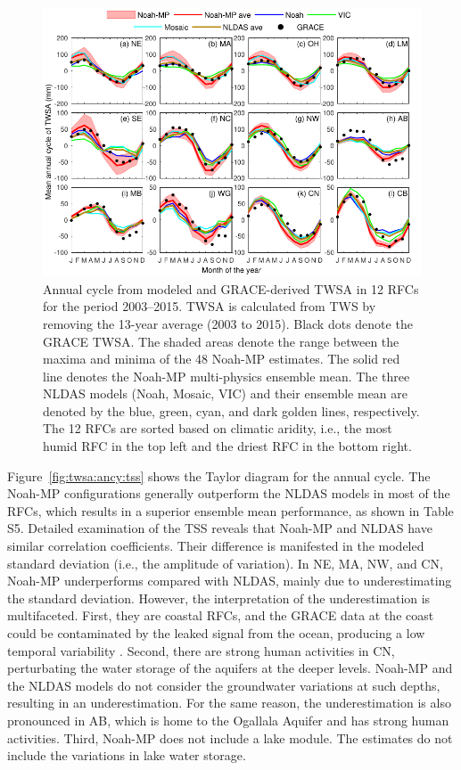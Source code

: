 \documentclass[essd, manuscript]{copernicus}
\begin{document}
\begin{figure}[t]
  \includegraphics[width=12cm]{fig/fig01.pdf}
  \caption{Annual cycle from modeled and GRACE-derived TWSA in 12 RFCs for the period 2003--2015. TWSA is calculated from TWS by removing the 13-year average (2003 to 2015). Black dots denote the GRACE TWSA\@. The shaded areas denote the range between the maxima and minima of the 48 Noah-MP estimates. The solid red line denotes the Noah-MP multi-physics ensemble mean. The three NLDAS models (Noah, Mosaic, VIC) and their ensemble mean are denoted by the blue, green, cyan, and dark golden lines, respectively. The 12 RFCs are sorted based on climatic aridity, i.e., the most humid RFC in the top left and the driest RFC in the bottom right.}
  \label{fig:twsa:ancy}
\end{figure}

Figure~\ref{fig:twsa:ancy:tss} shows the Taylor diagram for the annual cycle. The Noah-MP configurations generally outperform the NLDAS models in most of the RFCs, which results in a superior ensemble mean performance, as shown in Table S5. Detailed examination of the TSS reveals that Noah-MP and NLDAS have similar correlation coefficients. Their difference is manifested in the modeled standard deviation (i.e., the amplitude of variation). In NE, MA, NW, and CN, Noah-MP underperforms compared with NLDAS, mainly due to underestimating the standard deviation. However, the interpretation of the underestimation is multifaceted. First, they are coastal RFCs, and the GRACE data at the coast could be contaminated by the leaked signal from the ocean, producing a low temporal variability \citep{cai2014JGRAa}. Second, there are strong human activities in CN, perturbating the water storage of the aquifers at the deeper levels. Noah-MP and the NLDAS models do not consider the groundwater variations at such depths, resulting in an underestimation. For the same reason, the underestimation is also pronounced in AB, which is home to the Ogallala Aquifer and has strong human activities. Third, Noah-MP does not include a lake module. The estimates do not include the variations in lake water storage.
\end{document}

